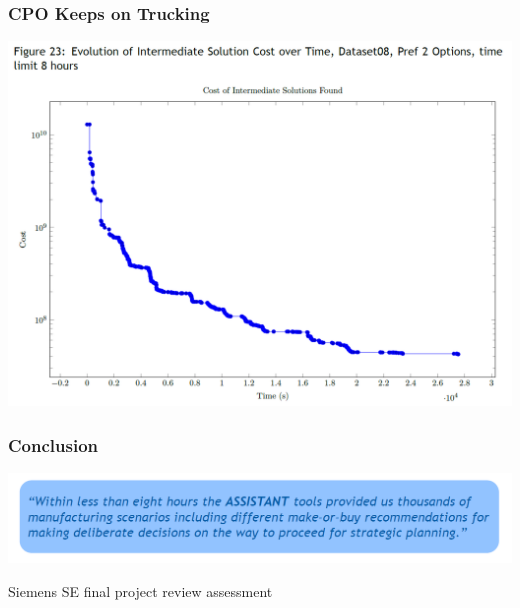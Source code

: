 \begin{frame}
\frametitle{CPO Keeps on Trucking}
\includegraphics[width=.65\textwidth]{imagesse/improving}
\end{frame}

\begin{frame}
\frametitle{Conclusion}
\includegraphics[width=.9\textwidth]{imagesse/quote}

{\tiny Siemens SE final project review assessment}
\end{frame}




